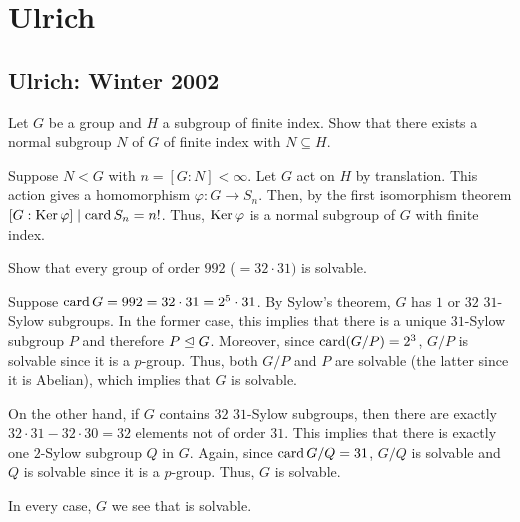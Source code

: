 \section{Ulrich}
\subsection{Ulrich: Winter 2002}
\setcounter{exercise}{0}
\setcounter{equation}{0}

\begin{problem}
  Let \(G\) be a group and \(H\) a subgroup of finite index. Show that
  there exists a normal subgroup \(N\) of \(G\) of finite index with
  \(N\subseteq H\).
\end{problem}
\begin{solution}
  Suppose \(N<G\) with \(n=[G:N]<\infty\). Let \(G\) act on \(H\) by
  translation. This action gives a homomorphism \(\varphi\colon G\to
  S_n\). Then, by the first isomorphism theorem
  \({[G:{\operatorname{Ker}\varphi}]}\mid{\operatorname{card}S_n=n!}\). Thus, \(\operatorname{Ker}\varphi\) is a
  normal subgroup of \(G\) with finite index.
\end{solution}

\begin{problem}
  Show that every group of order \(992\) (\(=32\cdot 31)\) is solvable.
\end{problem}
\begin{solution}
  Suppose \(\operatorname{card} G=992=32\cdot 31=2^5\cdot 31\). By Sylow's theorem, \(G\)
  has \(1\) or \(32\) \(31\)-Sylow subgroups. In the former case, this
  implies that there is a unique \(31\)-Sylow subgroup \(P\) and therefore
  \(P\trianglelefteq G\). Moreover, since \(\operatorname{card}(G/P)=2^3\), \(G/P\) is solvable
  since it is a \(p\)-group. Thus, both \(G/P\) and \(P\) are solvable
  (the latter since it is Abelian), which implies that \(G\) is solvable.

  On the other hand, if \(G\) contains \(32\) \(31\)-Sylow subgroups, then
  there are exactly \(32\cdot 31-32\cdot 30=32\) elements not of order
  \(31\). This implies that there is exactly one \(2\)-Sylow subgroup \(Q\)
  in \(G\). Again, since \(\operatorname{card} G/Q=31\), \(G/Q\) is solvable and \(Q\) is
  solvable since it is a \(p\)-group. Thus, \(G\) is solvable.

  In every case, \(G\) we see that is solvable.
\end{solution}

